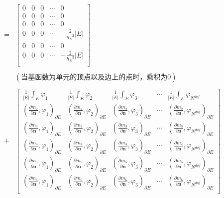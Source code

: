 \begin{equation*}
\begin{aligned}
= & \begin{bmatrix}
0 & 0 & 0 & \cdots & 0\\
0 & 0 & 0 & \cdots & 0\\
0 & 0 & 0 & \cdots & 0\\
0 & 0 & 0 & \cdots & -\frac{2}{{h_E}^2}|E|\\
0 & 0 & 0 & \cdots & 0\\
0 & 0 & 0 & \cdots & -\frac{2}{{h_E}^2}|E|\\
\end{bmatrix}\\
\\
& (\text{当基函数为单元的顶点以及边上的点时，乘积为}0)\\
\\
+ & \begin{bmatrix}
\frac{1}{|E|} \int_E \varphi_1 & \frac{1}{|E|} \int_E \varphi_2 & \frac{1}{|E|} \int_E \varphi_3 & \cdots & \frac{1}{|E|} \int_E \varphi_{N^{dof}}\\
(\frac{ \partial m_2}{\partial \mathbf n},\varphi_1)_{\partial E} & (\frac{ \partial m_2}{\partial \mathbf n},\varphi_2)_{\partial E} & (\frac{ \partial m_2}{\partial \mathbf n},\varphi_3)_{\partial E} & \cdots & (\frac{\partial m_2}{\partial \mathbf n},\varphi_{N^{dof}})_{\partial E}\\
(\frac{\partial m_{3}}{\partial \mathbf n}, \varphi_1)_{\partial E} & (\frac{\partial m_{3}}{\partial \mathbf n}, \varphi_2)_{\partial E} & (\frac{\partial m_{3}}{\partial \mathbf n}, \varphi_3)_{\partial E} & \cdots & (\frac{\partial m_{3}}{\partial \mathbf n}, \varphi_{N^{dof}})_{\partial E}\\
(\frac{\partial m_{4}}{\partial \mathbf n}, \varphi_1)_{\partial E} & (\frac{\partial m_{4}}{\partial \mathbf n}, \varphi_2)_{\partial E} & (\frac{\partial m_{4}}{\partial \mathbf n}, \varphi_3)_{\partial E} & \cdots & (\frac{\partial m_{4}}{\partial \mathbf n}, \varphi_{N^{dof}})_{\partial E}\\
(\frac{\partial m_{5}}{\partial \mathbf n}, \varphi_1)_{\partial E} & (\frac{\partial m_{5}}{\partial \mathbf n}, \varphi_2)_{\partial E} & (\frac{\partial m_{5}}{\partial \mathbf n}, \varphi_3)_{\partial E} & \cdots & (\frac{\partial m_{5}}{\partial \mathbf n}, \varphi_{N^{dof}})_{\partial E}\\
(\frac{\partial m_{6}}{\partial \mathbf n}, \varphi_1)_{\partial E} & (\frac{\partial m_{6}}{\partial \mathbf n}, \varphi_2)_{\partial E} & (\frac{\partial m_{6}}{\partial \mathbf n}, \varphi_3)_{\partial E} & \cdots & (\frac{\partial m_{6}}{\partial \mathbf n}, \varphi_{N^{dof}})_{\partial E}\\
\end{bmatrix}\\
\end{aligned}
\end{equation*}

